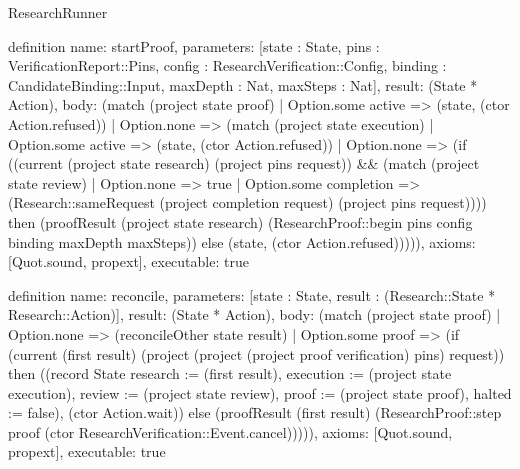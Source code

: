 \begin{lexlean}{ResearchRunner}
\begin{semanticmodule}
definition{
  name: startProof,
  parameters: [state : State, pins : VerificationReport::Pins, config : ResearchVerification::Config, binding : CandidateBinding::Input, maxDepth : Nat, maxSteps : Nat],
  result: (State * Action),
  body: (match (project state proof)
    | Option.some active => (state, (ctor Action.refused))
    | Option.none => (match (project state execution)
      | Option.some active => (state, (ctor Action.refused))
      | Option.none => (if ((current (project state research) (project pins request)) && (match (project state review) | Option.none => true | Option.some completion => (Research::sameRequest (project completion request) (project pins request)))) then (proofResult (project state research) (ResearchProof::begin pins config binding maxDepth maxSteps)) else (state, (ctor Action.refused))))),
  axioms: [Quot.sound, propext],
  executable: true
}

definition{
  name: reconcile,
  parameters: [state : State, result : (Research::State * Research::Action)],
  result: (State * Action),
  body: (match (project state proof)
    | Option.none => (reconcileOther state result)
    | Option.some proof => (if (current (first result) (project (project (project proof verification) pins) request)) then ((record State {research := (first result), execution := (project state execution), review := (project state review), proof := (project state proof), halted := false}), (ctor Action.wait)) else (proofResult (first result) (ResearchProof::step proof (ctor ResearchVerification::Event.cancel))))),
  axioms: [Quot.sound, propext],
  executable: true
}


\end{semanticmodule}
\end{lexlean}
